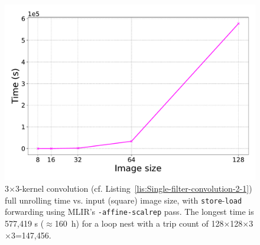 \documentclass[10pt]{sig-alternate}
\begin{document}
\begin{figure}[tbh]
\begin{centering}
\includegraphics[width=1\columnwidth,trim=0 7mm 0 6.5mm,clip]{figures/conv_unroll}
\par\end{centering}
\caption{3$\times$3-kernel convolution (cf. Listing~\ref{lis:Single-filter-convolution-2-1})
full unrolling time vs. input (square) image size, with \texttt{store}-\texttt{load}
forwarding using MLIR's \texttt{-affine-scalrep} pass. The
longest time is 577,419 s ($\approx$160~h) for a loop nest
with a trip count of 128$\times$128$\times$3$\times$3=147,456.
\label{fig:-kernel-convolution-full}
}
\end{figure}
\end{document}
